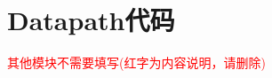 \appendix
\section{Datapath代码}
\textcolor{red}{其他模块不需要填写(红字为内容说明，请删除)}
\begin{lstlisting}[language=Verilog]

\end{lstlisting}
